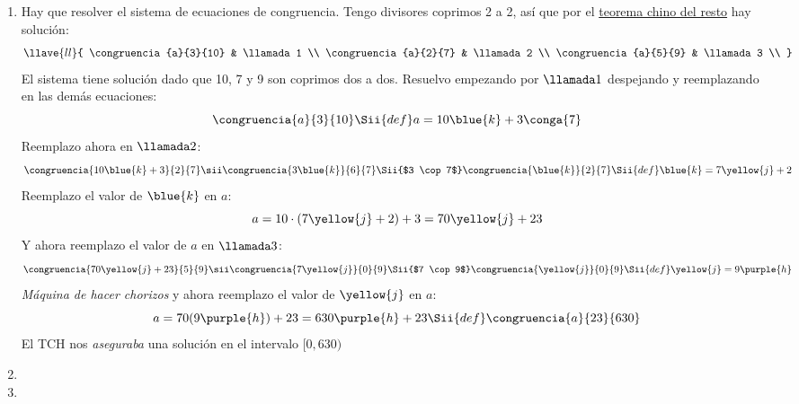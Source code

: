 \begin{enumerate}[label=\roman*)]
  \item Hay que resolver el sistema de ecuaciones de congruencia. Tengo
        divisores coprimos 2 a 2, así que por el \href{\chinito}{teorema
          chino del resto} hay solución:
        $$
          \llave{ll}{
            \congruencia{a}{3}{10} & \llamada1 \\
            \congruencia{a}{2}{7}  & \llamada2 \\
            \congruencia{a}{5}{9}  & \llamada3 \\
          }
        $$
        El sistema tiene solución dado que 10, 7 y 9 son coprimos dos a dos. Resuelvo empezando por $\llamada1$ despejando
        y reemplazando en las demás ecuaciones:
        $$
          \congruencia{a}{3}{10}
          \Sii{def}
          a = 10\blue{k} + 3 \conga{7}
        $$
        Reemplazo ahora en $\llamada2$:
        $$
          \congruencia{10 \blue{k} +3}{2}{7}
          \sii
          \congruencia{3\blue{k}}{6}{7}
          \Sii{$3 \cop 7$}
          \congruencia{\blue{k}}{2}{7}
          \Sii{def}
          \blue{k} = 7\yellow{j} + 2
        $$
        Reemplazo el valor de $\blue{k}$ en $a$:
        $$
          a = 10 \cdot ( 7\yellow{j} + 2) + 3 = 70 \yellow{j} + 23
        $$
        Y ahora reemplazo el valor de $a$ en $\llamada3$:
        $$
          \congruencia{70 \yellow{j} + 23}{5}{9}
          \sii
          \congruencia{7 \yellow{j}}{0}{9}
          \Sii{$7 \cop 9$}
          \congruencia{\yellow{j}}{0}{9}
          \Sii{def}
          \yellow{j} = 9\purple{h}
        $$
        \textit{Máquina de hacer chorizos}
        y ahora reemplazo el valor de $\yellow{j}$ en $a$:
        $$
          a = 70(9\purple{h}) + 23 = 630 \purple{h} + 23
          \Sii{def}
          \congruencia{a}{23}{630}
        $$
                El TCH nos \textit{aseguraba} una solución en el 
                intervalo $[0, 630)$ \Tilde

  \item \hacer

  \item \hacer
\end{enumerate}
